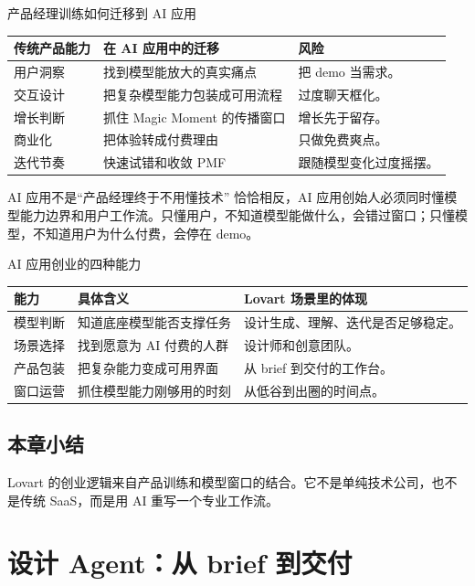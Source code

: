 \documentclass[a4paper]{article}
\begin{document}
\begin{knowledgebox}{产品经理训练如何迁移到 AI 应用}
\begin{tabularx}{\textwidth}{p{}p{}X}
\toprule
传统产品能力 & 在 AI 应用中的迁移 & 风险 \\
\midrule
用户洞察 & 找到模型能放大的真实痛点 & 把 demo 当需求。 \\
交互设计 & 把复杂模型能力包装成可用流程 & 过度聊天框化。 \\
增长判断 & 抓住 Magic Moment 的传播窗口 & 增长先于留存。 \\
商业化 & 把体验转成付费理由 & 只做免费爽点。 \\
迭代节奏 & 快速试错和收敛 PMF & 跟随模型变化过度摇摆。 \\
\bottomrule
\end{tabularx}
\end{knowledgebox}

\begin{warningbox}{AI 应用不是“产品经理终于不用懂技术”}
恰恰相反，AI 应用创始人必须同时懂模型能力边界和用户工作流。只懂用户，不知道模型能做什么，会错过窗口；只懂模型，不知道用户为什么付费，会停在 demo。
\end{warningbox}

\begin{knowledgebox}{AI 应用创业的四种能力}
\begin{tabularx}{\textwidth}{p{}p{}X}
\toprule
能力 & 具体含义 & Lovart 场景里的体现 \\
\midrule
模型判断 & 知道底座模型能否支撑任务 & 设计生成、理解、迭代是否足够稳定。 \\
场景选择 & 找到愿意为 AI 付费的人群 & 设计师和创意团队。 \\
产品包装 & 把复杂能力变成可用界面 & 从 brief 到交付的工作台。 \\
窗口运营 & 抓住模型能力刚够用的时刻 & 从低谷到出圈的时间点。 \\
\bottomrule
\end{tabularx}
\end{knowledgebox}

\subsection{本章小结}

Lovart 的创业逻辑来自产品训练和模型窗口的结合。它不是单纯技术公司，也不是传统 SaaS，而是用 AI 重写一个专业工作流。

\section{设计 Agent：从 brief 到交付}
\end{document}
